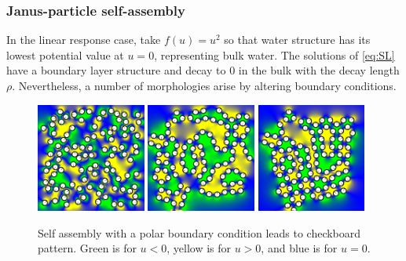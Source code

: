 \subsubsection{Janus-particle self-assembly} 
In the linear response case,
take $f(u) = u^2$ so that water structure has its lowest potential value
at $u = 0$, representing bulk water. The solutions of \eqref{eq:SL} have
a boundary layer structure and decay to 0 in the bulk with the decay
length $\rho$. Nevertheless, a number of morphologies arise by altering
boundary conditions.


\begin{figure}[h!]
  \begin{center}
    \includegraphics[width=0.32\textwidth]{figures/SpecificAim1/N100A1.pdf}
    \includegraphics[width=0.32\textwidth]{figures/SpecificAim1/N100A2.pdf}
    \includegraphics[width=0.32\textwidth]{figures/SpecificAim1/N100A3.pdf}
    \end{center}
  \caption{
    Self assembly with a polar boundary condition leads to checkboard pattern.
    Green is for $u < 0$, yellow is for $u > 0$, and blue is for $u = 0$.
    \label{fig:self-assemblyA}}
\end{figure}

